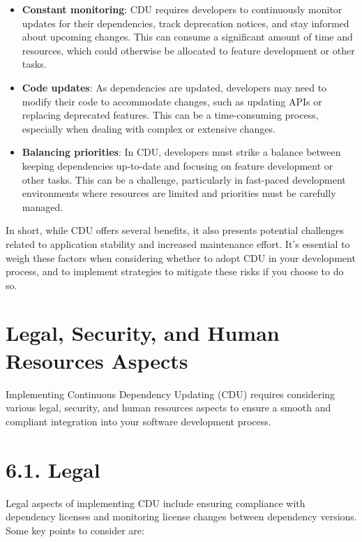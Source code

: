 \documentclass[10pt]{article}
\begin{document}
\begin{itemize}

  \item \textbf{Constant monitoring}: CDU requires developers to continuously monitor updates for their dependencies, track deprecation notices, and stay informed about upcoming changes. This can consume a significant amount of time and resources, which could otherwise be allocated to feature development or other tasks.

  \item \textbf{Code updates}: As dependencies are updated, developers may need to modify their code to accommodate changes, such as updating APIs or replacing deprecated features. This can be a time-consuming process, especially when dealing with complex or extensive changes.

  \item \textbf{Balancing priorities}: In CDU, developers must strike a balance between keeping dependencies up-to-date and focusing on feature development or other tasks. This can be a challenge, particularly in fast-paced development environments where resources are limited and priorities must be carefully managed.

\end{itemize}

In short, while CDU offers several benefits, it also presents potential challenges related to application stability and increased maintenance effort. It's essential to weigh these factors when considering whether to adopt CDU in your development process, and to implement strategies to mitigate these risks if you choose to do so.

\section*{Legal, Security, and Human Resources Aspects}

Implementing Continuous Dependency Updating (CDU) requires considering various legal, security, and human resources aspects to ensure a smooth and compliant integration into your software development process.

\section*{6.1. Legal}

Legal aspects of implementing CDU include ensuring compliance with dependency licenses and monitoring license changes between dependency versions. Some key points to consider are:
\end{document}
